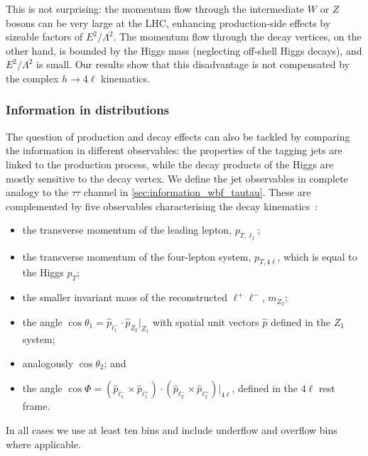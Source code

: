 This is not surprising: the momentum flow through the intermediate $W$
or $Z$ bosons can be very large at the LHC, enhancing production-side
effects by sizeable factors of $E^2 / \Lambda^2$. The momentum flow
through the decay vertices, on the other hand, is bounded by the Higgs
mass (neglecting off-shell Higgs decays), and $E^2 / \Lambda^2$ is
small. Our results show that this disadvantage is not compensated by
the complex $h \to 4\ell$ kinematics.



\subsubsection*{Information in distributions}

The question of production and decay effects can also be tackled by
comparing the information in different observables: the properties of
the tagging jets are linked to the production process, while the decay
products of the Higgs are mostly sensitive to the decay vertex. We
define the jet observables in complete analogy to the $\tau \tau$
channel in \autoref{sec:information_wbf_tautau}. These are complemented
by five observables characterising the decay
kinematics~\cite{Bolognesi:2012mm, Englert:2012xt}:
%
\begin{itemize}
\item the transverse momentum of the leading lepton, $p_{T,\ell_1}$;
\item the transverse momentum of the four-lepton system, $p_{T,4\ell}$, which is equal to the Higgs $p_T$;
\item the smaller invariant mass of the reconstructed $\ell^+ \ell^-$, $m_{Z_2}$;
\item the angle $\cos \theta_1 = \hat{p}_{\ell^-_1} \cdot \hat{p}_{Z_2}
  \Big|_{Z_1}$ with spatial unit vectors $\hat{p}$ defined in the $Z_1$ system;
\item analogously $\cos \theta_2$; and
\item the angle
  $\cos \Phi = ( \hat{p}_{\ell^-_1} \times \hat{p}_{\ell^+_1} )
  \cdot ( \hat{p}_{\ell^-_2} \times \hat{p}_{\ell^+_2} ) \Big|_{4\ell}$,
  defined in the $4\ell$ rest frame.
\end{itemize}
%
In all cases we use at least ten bins and include underflow and
overflow bins where applicable.

